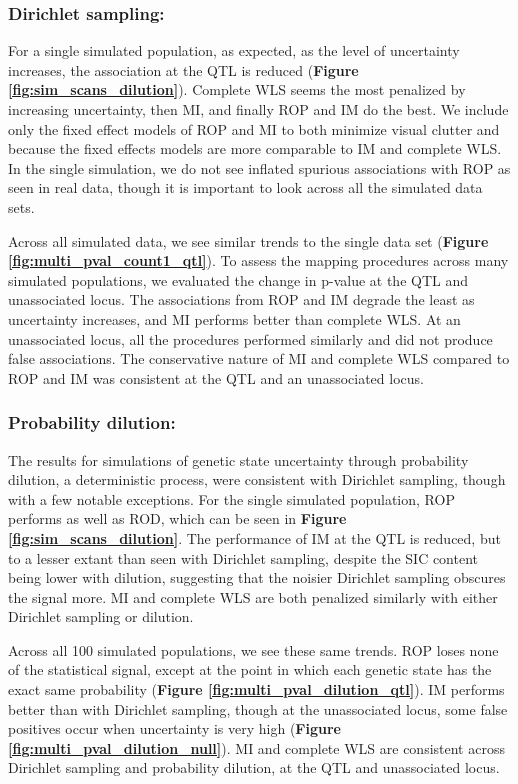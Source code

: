 \subsubsection{Dirichlet sampling:} For a single simulated population, as expected, as the level of uncertainty increases, the association at the QTL is reduced (\textbf{Figure \ref{fig:sim_scans_dilution}}). Complete WLS seems the most penalized by increasing uncertainty, then MI, and finally ROP and IM do the best. We include only the fixed effect models of ROP and MI to both minimize visual clutter and because the fixed effects models are more comparable to IM and complete WLS. In the single simulation, we do not see inflated spurious associations with ROP as seen in real data, though it is important to look across all the simulated data sets. 

Across all simulated data, we see similar trends to the single data set (\textbf{Figure \ref{fig:multi_pval_count1_qtl}}). To assess the mapping procedures across many simulated populations, we evaluated the change in p-value at the QTL and unassociated locus. The associations from ROP and IM degrade the least as uncertainty increases, and MI performs better than complete WLS. At an unassociated locus, all the procedures performed similarly and did not produce false associations. The conservative nature of MI and complete WLS compared to ROP and IM was consistent at the QTL and an unassociated locus.

\subsubsection{Probability dilution:} 
The results for simulations of genetic state uncertainty through probability dilution, a deterministic process, were consistent with Dirichlet sampling, though with a few notable exceptions. For the single simulated population, ROP performs as well as ROD, which can be seen in \textbf{Figure \ref{fig:sim_scans_dilution}}. The performance of IM at the QTL is reduced, but to a lesser extant than seen with Dirichlet sampling, despite the SIC content being lower with dilution, suggesting that the noisier Dirichlet sampling obscures the signal more. MI and complete WLS are both penalized similarly with either Dirichlet sampling or dilution.

Across all 100 simulated populations, we see these same trends. ROP loses none of the statistical signal, except at the point in which each genetic state has the exact same probability (\textbf{Figure \ref{fig:multi_pval_dilution_qtl}}). IM performs better than with Dirichlet sampling, though at the unassociated locus, some false positives occur when uncertainty is very high (\textbf{Figure \ref{fig:multi_pval_dilution_null}}). MI and complete WLS are consistent across Dirichlet sampling and probability dilution, at the QTL and unassociated locus.

